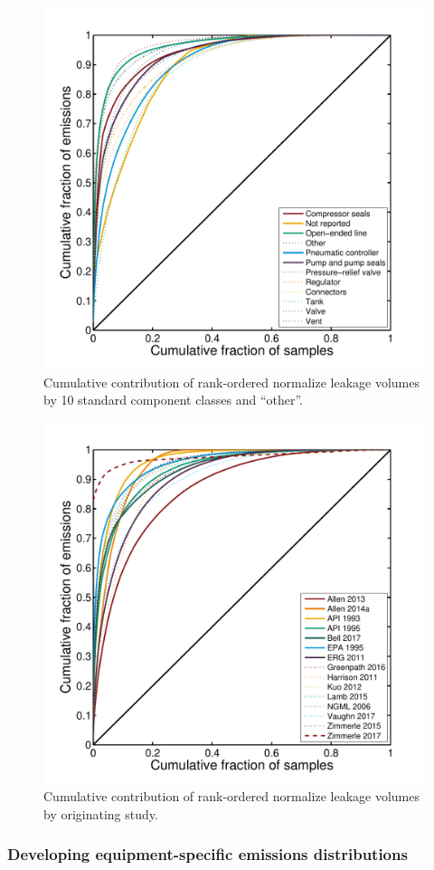 \documentclass[11pt]{report}
\begin{document}
{{{{\begin{figure}[]
\includegraphics[width=0.7\columnwidth]{images/Components_Fat_Tail_Cumulative.pdf}
\caption{Cumulative contribution of rank-ordered normalize leakage volumes by 10 standard component classes and ``other''.}
\label{fig:Fat_Tail_Components}
\end{figure}

\begin{figure}[]
\includegraphics[width=0.7\columnwidth]{images/Studies_Fat_Tail_Cumulative.pdf}
\caption{Cumulative contribution of rank-ordered normalize leakage volumes by originating study.}
\label{fig:Fat_Tail_Study}
\end{figure}


\subsubsection{Developing equipment-specific emissions distributions}

}}}}
\end{document}
